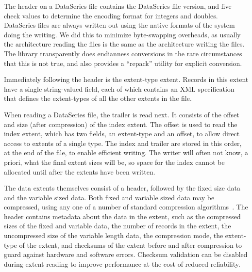 The header on a DataSeries file contains the DataSeries file version,
and five check values 
to determine the encoding format for integers and doubles.
DataSeries files
are always written out using the native formats of the system doing
the writing. We did this to minimize byte-swapping overheads,
as usually the architecture reading the files is the same 
as the architecture writing the files.
The library transparently does endianness conversions in the 
rare circumstances that this is not true, and also provides a ``repack''
utility for explicit conversion.

Immediately following the header is the extent-type extent. Records in
this extent have a single string-valued field, each of which 
contains an XML specification that defines the extent-types of all the 
other extents in the file.  



When reading a DataSeries file, the trailer is read next.  It consists
of the offset and size (after compression) of the index extent.  The
offset is used to read the index extent, which has two fields, an
extent-type and an offset, to allow direct access to extents of a single type.
The index and trailer are
stored in this order, at the end of the file, to enable efficient
writing. The writer will often not know, a priori, what the final
extent sizes will be, so space for the index cannot be allocated until
after the extents have been written.

The data extents themselves consist of a header, followed by the 
fixed size data
and the variable sized data.  Both fixed and variable sized data may be
compressed, using any one of a number of standard compression
algorithms~\cite{GZIP,BZIP,LZF,LZO}.  The header contains metadata
about the data in the extent, such as the compressed sizes of the
fixed and variable data, the number of records in the extent, the
uncompressed size of the variable length data, the compression mode,
the extent-type of the extent, and checksums of the extent before and
after compression to guard against hardware and software errors.
Checksum validation can be disabled during extent reading to improve
performance at the cost of reduced reliability.

